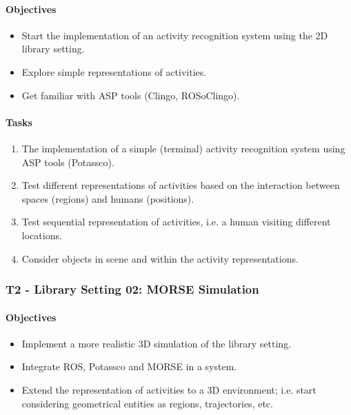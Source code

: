 \paragraph{Objectives}
\begin{itemize}
\item Start the implementation of an activity recognition system using the 2D library setting.
\item Explore simple representations of activities.
\item Get familiar with ASP tools (Clingo, ROSoClingo).
\end{itemize}
\paragraph{Tasks}
\begin{enumerate}
\item The implementation of a simple (terminal) activity recognition system using ASP tools (Potassco).
\item Test different representations of activities based on the interaction between spaces (regions) and humans (positions).
\item Test sequential representation of activities, i.e. a human visiting different locations.
\item Consider objects in scene and within the activity representations.
\end{enumerate}


\subsubsection*{T2 - Library Setting 02: MORSE Simulation}
\paragraph{Objectives}
\begin{itemize}
\item Implement a more realistic 3D simulation of the library setting.
\item Integrate ROS, Potassco and MORSE in a system.
\item Extend the representation of activities to a 3D environment; i.e. start considering geometrical entities as regions, trajectories, etc.
\end{itemize}
